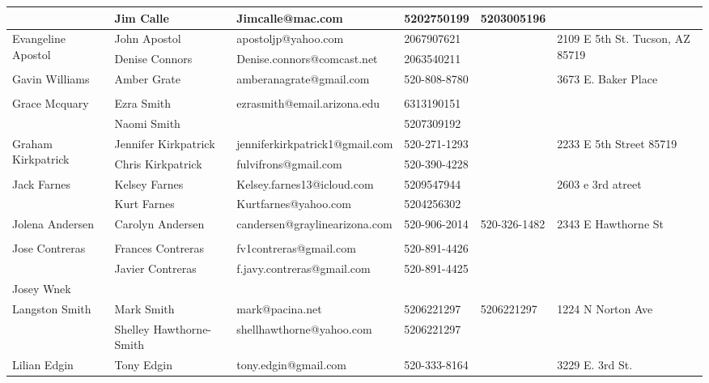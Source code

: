 \documentclass[landscape]{article}\usepackage[]{graphicx}\usepackage[]{color}
\begin{document}
\begin{longtable}{|p{100pt}|p{100pt}|p{140pt}|p{60pt}|p{64pt}|p{120pt}|}
 & Jim Calle & Jimcalle@mac.com & 5202750199 & 5203005196 & \\
\hline
\multirow{2}{100pt}{Evangeline Apostol} & John Apostol & apostoljp@yahoo.com & 2067907621 &  & \multirow{2}{120pt}{2109 E 5th St. Tucson, AZ 85719} \\
 & Denise Connors & Denise.connors@comcast.net & 2063540211 &  & \\
\hline
\multirow{2}{100pt}{Gavin Williams} & Amber Grate & amberanagrate@gmail.com & 520-808-8780 &  & \multirow{2}{120pt}{3673 E. Baker Place} \\
 &  &  &  &  & \\
\hline
\multirow{2}{100pt}{Grace Mcquary} & Ezra Smith & ezrasmith@email.arizona.edu & 6313190151 &  & \multirow{2}{120pt}{} \\
 & Naomi Smith &  & 5207309192 &  & \\
\hline
\multirow{2}{100pt}{Graham Kirkpatrick} & Jennifer Kirkpatrick & jenniferkirkpatrick1@gmail.com & 520-271-1293 &  & \multirow{2}{120pt}{2233 E 5th Street 85719} \\
 & Chris Kirkpatrick & fulvifrons@gmail.com & 520-390-4228 &  & \\
\hline
\multirow{2}{100pt}{Jack Farnes} & Kelsey Farnes & Kelsey.farnes13@icloud.com & 5209547944 &  & \multirow{2}{120pt}{2603 e 3rd atreet} \\
 & Kurt Farnes & Kurtfarnes@yahoo.com & 5204256302 &  & \\
\hline
\multirow{2}{100pt}{Jolena Andersen} & Carolyn Andersen & candersen@graylinearizona.com & 520-906-2014 & 520-326-1482 & \multirow{2}{120pt}{2343 E Hawthorne St} \\
 &  &  &  &  & \\
\hline
\multirow{2}{100pt}{Jose Contreras} & Frances Contreras & fv1contreras@gmail.com  & 520-891-4426 &  & \multirow{2}{120pt}{} \\
 & Javier Contreras & f.javy.contreras@gmail.com  & 520-891-4425 &  & \\
\hline
\multirow{2}{100pt}{Josey Wnek} &  &  &  &  & \multirow{2}{120pt}{} \\
 &  &  &  &  & \\
\hline
\multirow{2}{100pt}{Langston Smith} & Mark Smith & mark@pacina.net & 5206221297 & 5206221297 & \multirow{2}{120pt}{1224 N Norton Ave} \\
 & Shelley Hawthorne-Smith & shellhawthorne@yahoo.com & 5206221297 &  & \\
\hline
\multirow{2}{100pt}{Lilian Edgin} & Tony Edgin & tony.edgin@gmail.com & 520-333-8164 &  & \multirow{2}{120pt}{3229 E. 3rd St.} \\

\end{longtable}
\end{document}
